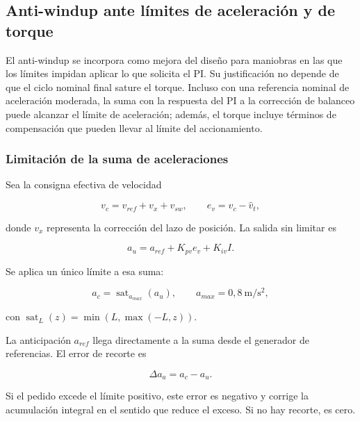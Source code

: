 \documentclass[a4paper,10pt,onecolumn,journal]{ieeeconf}
\numberwithin{equation}{section}
\begin{document}

\subsection{Anti-windup ante límites de aceleración y de torque}
\label{sec:integracion_aw}

El anti-windup se incorpora como mejora del diseño para maniobras en las que los límites impidan aplicar lo que solicita el PI. Su justificación no depende de que el ciclo nominal final sature el torque. Incluso con una referencia nominal de aceleración moderada, la suma con la respuesta del PI a la corrección de balanceo puede alcanzar el límite de aceleración; además, el torque incluye términos de compensación que pueden llevar al límite del accionamiento.


\subsubsection{Limitación de la suma de aceleraciones}

Sea la consigna efectiva de velocidad

\begin{equation}
v_c=v_{ref}+v_x+v_{sw},\qquad e_v=v_c-\hat v_t,
\end{equation}

donde $v_x$ representa la corrección del lazo de posición. La salida sin limitar es

\begin{equation}
a_u=a_{ref}+K_{pv}e_v+K_{iv}I.
\end{equation}

Se aplica un único límite a esa suma:

\begin{equation}
a_c=\operatorname{sat}_{a_{max}}(a_u),\qquad a_{max}=0,8\ \mathrm{m/s^2},
\end{equation}

con $\operatorname{sat}_L(z)=\min(L,\max(-L,z))$.

La anticipación $a_{ref}$ llega directamente a la suma desde el generador de referencias. El error de recorte es

\begin{equation}
\Delta a_a=a_c-a_u.
\end{equation}

Si el pedido excede el límite positivo, este error es negativo y corrige la acumulación integral en el sentido que reduce el exceso. Si no hay recorte, es cero.
\end{document}

